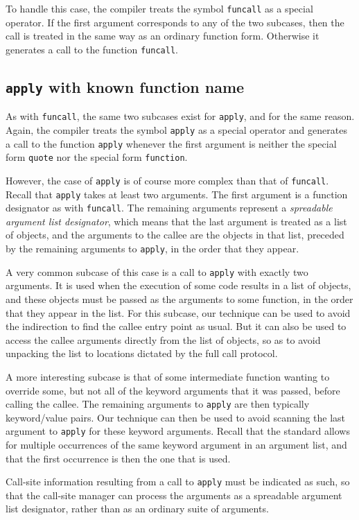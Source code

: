 To handle this case, the compiler treats the symbol \texttt{funcall}
as a special operator.  If the first argument corresponds to any of
the two subcases, then the call is treated in the same way as an
ordinary function form.  Otherwise it generates a call to the function
\texttt{funcall}.

\subsection{\texttt{apply} with known function name}

As with \texttt{funcall}, the same two subcases exist for
\texttt{apply}, and for the same reason.  Again, the compiler treats
the symbol \texttt{apply} as a special operator and generates a call
to the function \texttt{apply} whenever the first argument is neither
the special form \texttt{quote} nor the special form
\texttt{function}.

However, the case of \texttt{apply} is of course more complex than
that of \texttt{funcall}.  Recall that \texttt{apply} takes at least
two arguments.  The first argument is a function designator as with
\texttt{funcall}.  The remaining arguments represent a
\emph{spreadable argument list designator}, which means that the last
argument is treated as a list of objects, and the arguments to the
callee are the objects in that list, preceded by the remaining
arguments to \texttt{apply}, in the order that they appear.

A very common subcase of this case is a call to \texttt{apply} with
exactly two arguments.  It is used when the execution of some code
results in a list of objects, and these objects must be passed as the
arguments to some function, in the order that they appear in the
list.  For this subcase, our technique can be used to avoid the
indirection to find the callee entry point as usual.  But it can also
be used to access the callee arguments directly from the list of
objects, so as to avoid unpacking the list to locations dictated by
the full call protocol.

A more interesting subcase is that of some intermediate function
wanting to override some, but not all of the keyword arguments that it
was passed, before calling the callee.  The remaining arguments to
\texttt{apply} are then typically keyword/value pairs.  Our technique
can then be used to avoid scanning the last argument to \texttt{apply}
for these keyword arguments.  Recall that the standard allows for
multiple occurrences of the same keyword argument in an argument list,
and that the first occurrence is then the one that is used.

Call-site information resulting from a call to \texttt{apply} must be
indicated as such, so that the call-site manager can process the
arguments as a spreadable argument list designator, rather than as an
ordinary suite of arguments.

